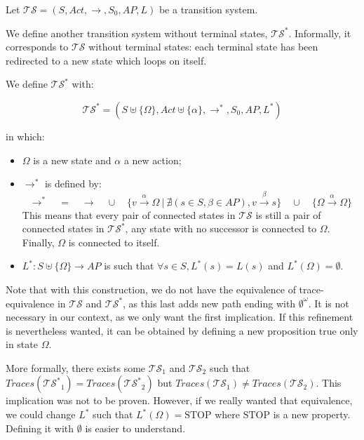 \documentclass[11pt,a4paper]{article}
\def\ts{\mathcal{TS}}
\def\tss{\mathcal{TS^*}}
\def\traces{\mathit{Traces}}
\begin{document}
\begin{Answer}
\Question%
Let $\ts=(S,\mathit{Act},\rightarrow,S_0,\mathit{AP},L)$ be a transition system.

We define another transition system without terminal states, $\tss$. Informally, it corresponds to $\ts$ without terminal states: each terminal state has been redirected to a new state which loops on itself.

We define $\ts^*$ with:

$$\tss=(S\uplus\{\Omega\},\mathit{Act}\uplus\{\alpha\},\rightarrow^*,S_0,\mathit{AP},L^*)$$

in which:
\begin{itemize}
	\item $\Omega$ is a new state and $\alpha$ a new action;
	\item $\rightarrow^*$ is defined by:
		$$\rightarrow^*\quad=\quad\rightarrow\quad\cup\quad\{v\xrightarrow{\alpha} \Omega~|~\nexists (s\in S, \beta\in\mathit{AP}), v\xrightarrow{\beta}s\}\quad\cup\quad\{\Omega\xrightarrow{\alpha}\Omega\}$$%
		This means that every pair of connected states in $\mathcal{TS}$ is still a pair of connected states in $\mathcal{TS^*}$, any state with no successor is connected to $\Omega$. Finally, $\Omega$ is connected to itself.
	\item $L^* : S\uplus\{\Omega\} \to \mathit{AP}$ is such that $\forall s\in S,  L^*(s) = L(s)$ and $L^*(\Omega) = \emptyset$.
\end{itemize}

Note that with this construction, we do not have the equivalence of trace-equivalence in $\ts$ and $\tss$, as this last adds new path ending with $\emptyset^\omega$.
It is not necessary in our context, as we only want the first implication. If this refinement is nevertheless wanted, it can be obtained by defining a new proposition true only in state $\Omega$.

More formally, there exists some $\ts_1$ and $\ts_2$ such that $\traces(\tss_1)=\traces(\tss_2)$ but $\traces(\ts_1)\neq\traces(\ts_2)$. This implication was not to be proven. However, if we really wanted that equivalence, we could change $L^*$ such that $L^*(\Omega)=\text{STOP}$ where $\text{STOP}$ is a new property. Defining it with $\emptyset$ is easier to understand. %



\end{Answer}
\end{document}
